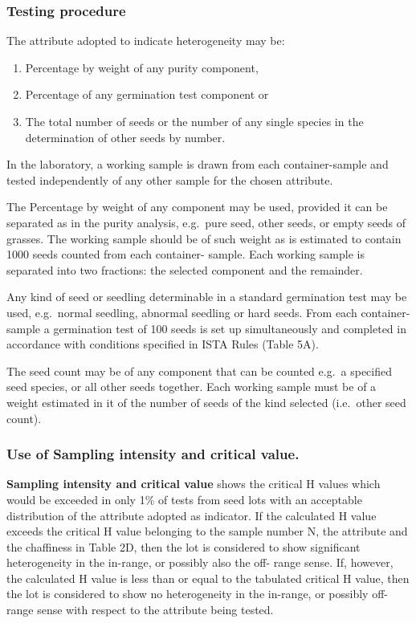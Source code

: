 \documentclass[
]{book}
\begin{document}
\hypertarget{testing-procedure}{%
\subsubsection{Testing procedure}\label{testing-procedure}}

The attribute adopted to indicate heterogeneity may be:

\begin{enumerate}
\def\labelenumi{\alph{enumi})}
\item
  Percentage by weight of any purity component,
\item
  Percentage of any germination test component or
\item
  The total number of seeds or the number of any single species in the determination of other seeds by number.
\end{enumerate}

In the laboratory, a working sample is drawn from each container-sample and tested independently of any other sample for the chosen attribute.

The Percentage by weight of any component may be used, provided it can be separated as in the purity analysis, e.g.~pure seed, other seeds, or empty seeds of grasses. The working sample should be of such weight as is estimated to contain 1000 seeds counted from each container- sample. Each working sample is separated into two fractions: the selected component and the remainder.

Any kind of seed or seedling determinable in a standard germination test may be used, e.g.~normal seedling, abnormal seedling or hard seeds. From each container- sample a germination test of 100 seeds is set up simultaneously and completed in accordance with conditions specified in ISTA Rules (Table 5A).

The seed count may be of any component that can be counted e.g.~a specified seed species, or all other seeds together. Each working sample must be of a weight estimated in it of the number of seeds of the kind selected (i.e.~other seed count).

\hypertarget{use-of-sampling-intensity-and-critical-value.}{%
\subsubsection{Use of Sampling intensity and critical value.}\label{use-of-sampling-intensity-and-critical-value.}}

\textbf{Sampling intensity and critical value} shows the critical H values which would be exceeded in only 1\% of tests from seed lots with an acceptable distribution of the attribute adopted as indicator. If the calculated H value exceeds the critical H value belonging to the sample number N, the attribute and the chaffiness in Table 2D, then the lot is considered to show significant heterogeneity in the in-range, or possibly also the off- range sense. If, however, the calculated H value is less than or equal to the tabulated critical H value, then the lot is considered to show no heterogeneity in the in-range, or possibly off-range sense with respect to the attribute being tested.
\end{document}
